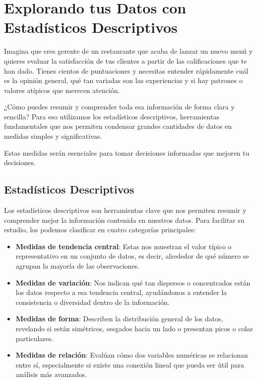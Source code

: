 \documentclass[
  spanish,
  letterpaper,
  DIV=11,
  numbers=noendperiod]{scrreprt}
\providecommand{\tightlist}{%
  \setlength{\itemsep}{0pt}\setlength{\parskip}{0pt}}
\begin{document}

\chapter{Explorando tus Datos con Estadísticos
Descriptivos}\label{explorando-tus-datos-con-estaduxedsticos-descriptivos}

Imagina que eres gerente de un restaurante que acaba de lanzar un nuevo
menú y quieres evaluar la satisfacción de tus clientes a partir de las
calificaciones que te han dado. Tienes cientos de puntuaciones y
necesitas entender rápidamente cuál es la opinión general, qué tan
variadas son las experiencias y si hay patrones o valores atípicos que
merecen atención.

¿Cómo puedes resumir y comprender toda esa información de forma clara y
sencilla? Para eso utilizamos los estadísticos descriptivos,
herramientas fundamentales que nos permiten condensar grandes cantidades
de datos en medidas simples y significativas.

Estas medidas serán esenciales para tomar decisiones informadas que
mejoren tu decisiones.

\section{Estadísticos Descriptivos}\label{estaduxedsticos-descriptivos}

Los estadísticos descriptivos son herramientas clave que nos permiten
resumir y comprender mejor la información contenida en nuestros datos.
Para facilitar su estudio, los podemos clasificar en cuatro categorías
principales:

\begin{itemize}
\tightlist
\item
  \textbf{Medidas de tendencia central}: Estas nos muestran el valor
  típico o representativo en un conjunto de datos, es decir, alrededor
  de qué número se agrupan la mayoría de las observaciones.
\item
  \textbf{Medidas de variación}: Nos indican qué tan dispersos o
  concentrados están los datos respecto a esa tendencia central,
  ayudándonos a entender la consistencia o diversidad dentro de la
  información.
\item
  \textbf{Medidas de forma}: Describen la distribución general de los
  datos, revelando si están simétricos, sesgados hacia un lado o
  presentan picos o colas particulares.
\item
  \textbf{Medidas de relación}: Evalúan cómo dos variables numéricas se
  relacionan entre sí, especialmente si existe una conexión lineal que
  pueda ser útil para análisis más avanzados.
\end{itemize}
\end{document}
